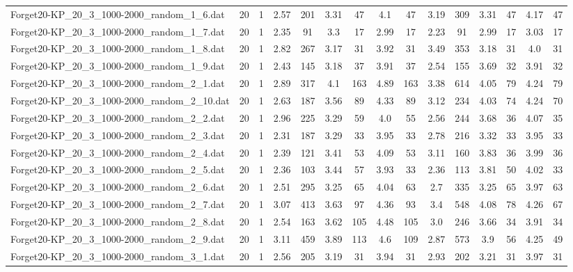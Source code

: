 \begin{table}[!ht]
{\begin{tabular}{lcccccccccccccc}
Forget20-KP\_20\_3\_1000-2000\_random\_1\_6.dat & 20 & 1 & 2.57 & 201 & 3.31 & 47 & 4.1 & 47 & 3.19 & 309 & 3.31 & 47 & 4.17 & 47 \\
Forget20-KP\_20\_3\_1000-2000\_random\_1\_7.dat & 20 & 1 & 2.35 & 91 & 3.3 & 17 & 2.99 & 17 & 2.23 & 91 & 2.99 & 17 & 3.03 & 17 \\
Forget20-KP\_20\_3\_1000-2000\_random\_1\_8.dat & 20 & 1 & 2.82 & 267 & 3.17 & 31 & 3.92 & 31 & 3.49 & 353 & 3.18 & 31 & 4.0 & 31 \\
Forget20-KP\_20\_3\_1000-2000\_random\_1\_9.dat & 20 & 1 & 2.43 & 145 & 3.18 & 37 & 3.91 & 37 & 2.54 & 155 & 3.69 & 32 & 3.91 & 32 \\
Forget20-KP\_20\_3\_1000-2000\_random\_2\_1.dat & 20 & 1 & 2.89 & 317 & 4.1 & 163 & 4.89 & 163 & 3.38 & 614 & 4.05 & 79 & 4.24 & 79 \\
Forget20-KP\_20\_3\_1000-2000\_random\_2\_10.dat & 20 & 1 & 2.63 & 187 & 3.56 & 89 & 4.33 & 89 & 3.12 & 234 & 4.03 & 74 & 4.24 & 70 \\
Forget20-KP\_20\_3\_1000-2000\_random\_2\_2.dat & 20 & 1 & 2.96 & 225 & 3.29 & 59 & 4.0 & 55 & 2.56 & 244 & 3.68 & 36 & 4.07 & 35 \\
Forget20-KP\_20\_3\_1000-2000\_random\_2\_3.dat & 20 & 1 & 2.31 & 187 & 3.29 & 33 & 3.95 & 33 & 2.78 & 216 & 3.32 & 33 & 3.95 & 33 \\
Forget20-KP\_20\_3\_1000-2000\_random\_2\_4.dat & 20 & 1 & 2.39 & 121 & 3.41 & 53 & 4.09 & 53 & 3.11 & 160 & 3.83 & 36 & 3.99 & 36 \\
Forget20-KP\_20\_3\_1000-2000\_random\_2\_5.dat & 20 & 1 & 2.36 & 103 & 3.44 & 57 & 3.93 & 33 & 2.36 & 113 & 3.81 & 50 & 4.02 & 33 \\
Forget20-KP\_20\_3\_1000-2000\_random\_2\_6.dat & 20 & 1 & 2.51 & 295 & 3.25 & 65 & 4.04 & 63 & 2.7 & 335 & 3.25 & 65 & 3.97 & 63 \\
Forget20-KP\_20\_3\_1000-2000\_random\_2\_7.dat & 20 & 1 & 3.07 & 413 & 3.63 & 97 & 4.36 & 93 & 3.4 & 548 & 4.08 & 78 & 4.26 & 67 \\
Forget20-KP\_20\_3\_1000-2000\_random\_2\_8.dat & 20 & 1 & 2.54 & 163 & 3.62 & 105 & 4.48 & 105 & 3.0 & 246 & 3.66 & 34 & 3.91 & 34 \\
Forget20-KP\_20\_3\_1000-2000\_random\_2\_9.dat & 20 & 1 & 3.11 & 459 & 3.89 & 113 & 4.6 & 109 & 2.87 & 573 & 3.9 & 56 & 4.25 & 49 \\
Forget20-KP\_20\_3\_1000-2000\_random\_3\_1.dat & 20 & 1 & 2.56 & 205 & 3.19 & 31 & 3.94 & 31 & 2.93 & 202 & 3.21 & 31 & 3.97 & 31 \\

\end{tabular}}
\end{table}
